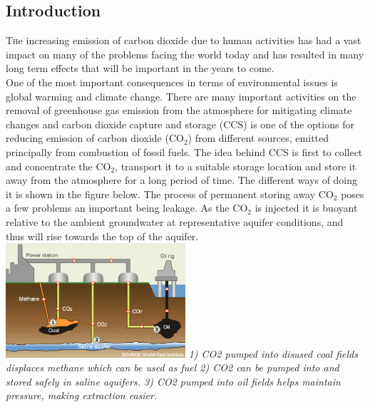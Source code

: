 \documentclass[twoside]{article}
\begin{document}
\begin{multicols}{2} %

\section{Introduction}

\lettrine[nindent=0em,lines=3]{T} he increasing emission of carbon dioxide due to human activities has had a vast impact on many of the problems facing the world today and has resulted in many long term effects that will be important in the years to come. \\
One of the most important consequences in terms of environmental issues is global warming and climate change. There are many important activities on the removal of greenhouse gas emission from the atmosphere for mitigating climate changes and carbon dioxide capture and storage (CCS) is one of the options for reducing emission of carbon dioxide (CO$_2$) from different sources, emitted principally from combustion of fossil fuels. The idea behind CCS is first to collect and concentrate the CO$_2$, transport it to a suitable storage location and store it away from the atmosphere for a long period of time. The different ways of doing it is shown in the figure below. The process of permanent storing away CO$_2$ poses a few problems an important being leakage. As the CO$_2$ is injected it is buoyant relative to the ambient groundwater at representative aquifer conditions, and thus will rise towards the top of the aquifer. \\
\includegraphics[width=0.5\textwidth]{ccs.png}\label{fig:ccs}
\textit{1) CO2 pumped into disused coal fields displaces methane which can be used as fuel 2) CO2 can be pumped into and stored safely in saline aquifers. 3) CO2 pumped into oil fields helps maintain pressure, making extraction easier.}\\


\end{multicols}
\end{document}
